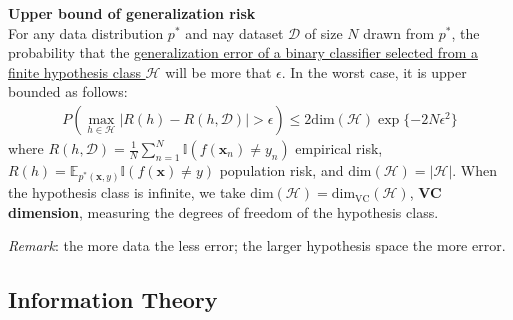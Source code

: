 \begin{theorem}\label{thm:boundgenerror}
    \textbf{{Upper bound of generalization risk}}\\
    For any data distribution $p^*$ and nay dataset $\mathcal{D}$ of size $N$ drawn from $p^*$,
    the probability that the \uline{generalization error of a binary classifier selected from a finite hypothesis class $\mathcal{H}$} 
    will be more that $\epsilon$.
    In the worst case, it is upper bounded as follows:
    \begin{gather}
        P\left(
            \max_{h\in\mathcal{H}}{|R(h)-R(h,\mathcal{D})|}>\epsilon
        \right)
        \leq 2\mathrm{dim}(\mathcal{H})\exp\{-2N\epsilon^2\}
    \end{gather}
    where $R(h,\mathcal{D})=\frac{1}{N}\sum_{n=1}^N \mathbb{I}(f(\bm{x}_n)\neq y_n)$ empirical risk, 
    $R(h)=\mathbb{E}_{p^*(\bm{x},y)}\mathbb{I}(f(\bm{x})\neq y)$ population risk, 
    and $\mathrm{dim}(\mathcal{H})=|\mathcal{H}|$.
    When the hypothesis class is infinite, we take $\mathrm{dim}(\mathcal{H})=\mathrm{dim}_\text{VC}(\mathcal{H})$,
    \textbf{VC dimension}, measuring the degrees of freedom of the hypothesis class.
    
    \textit{Remark}: the more data the less error; the larger hypothesis space the more error.
\end{theorem}


\subsection{Information Theory}




